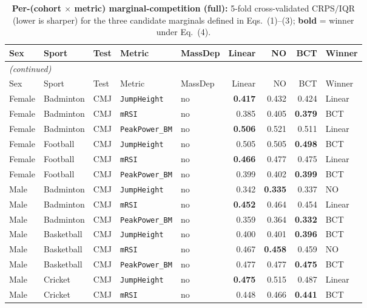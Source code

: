 {\small
\begin{longtable}{lllllrrrl}
\caption{\textbf{Per-(cohort $\times$ metric) marginal-competition (full):} 5-fold cross-validated CRPS$/$IQR (lower is sharper) for the three candidate marginals defined in Eqs.~(1)--(3); \textbf{bold} = winner under Eq.~(4).}\label{tab:marg_full}\\
\toprule
Sex & Sport & Test & Metric & MassDep & Linear & NO & BCT & Winner \\
\midrule
\endfirsthead
\multicolumn{9}{l}{\emph{(continued)}} \\
\toprule
Sex & Sport & Test & Metric & MassDep & Linear & NO & BCT & Winner \\
\midrule
\endhead
\bottomrule
\endfoot
Female & Badminton & CMJ & \texttt{JumpHeight} & no & \textbf{0.417} & 0.432 & 0.424 & Linear \\
Female & Badminton & CMJ & \texttt{mRSI} & no & 0.385 & 0.405 & \textbf{0.379} & BCT \\
Female & Badminton & CMJ & \texttt{PeakPower\_BM} & no & \textbf{0.506} & 0.521 & 0.511 & Linear \\
Female & Football & CMJ & \texttt{JumpHeight} & no & 0.505 & 0.505 & \textbf{0.498} & BCT \\
Female & Football & CMJ & \texttt{mRSI} & no & \textbf{0.466} & 0.477 & 0.475 & Linear \\
Female & Football & CMJ & \texttt{PeakPower\_BM} & no & 0.399 & 0.402 & \textbf{0.399} & BCT \\
Male & Badminton & CMJ & \texttt{JumpHeight} & no & 0.342 & \textbf{0.335} & 0.337 & NO \\
Male & Badminton & CMJ & \texttt{mRSI} & no & \textbf{0.452} & 0.464 & 0.454 & Linear \\
Male & Badminton & CMJ & \texttt{PeakPower\_BM} & no & 0.359 & 0.364 & \textbf{0.332} & BCT \\
Male & Basketball & CMJ & \texttt{JumpHeight} & no & 0.400 & 0.401 & \textbf{0.396} & BCT \\
Male & Basketball & CMJ & \texttt{mRSI} & no & 0.467 & \textbf{0.458} & 0.459 & NO \\
Male & Basketball & CMJ & \texttt{PeakPower\_BM} & no & 0.477 & 0.477 & \textbf{0.475} & BCT \\
Male & Cricket & CMJ & \texttt{JumpHeight} & no & \textbf{0.475} & 0.515 & 0.487 & Linear \\
Male & Cricket & CMJ & \texttt{mRSI} & no & 0.448 & 0.466 & \textbf{0.441} & BCT \\

\end{longtable}}
